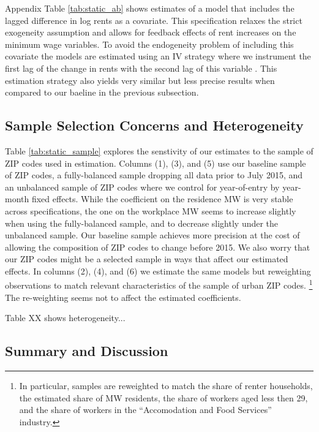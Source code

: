 Appendix Table \ref{tab:static_ab} shows estimates of a model that includes
the lagged difference in log rents as a covariate.
This specification relaxes the strict exogeneity assumption and allows for 
feedback effects of rent increases on the minimum wage variables.
To avoid the endogeneity problem of including this covariate the models are 
estimated using an IV strategy where we instrument the first lag of the change 
in rents with the second lag of this variable 
\parencite{ArellanoBond1991,ArellanoHonore2001}.
This estimation strategy also yields very similar but less precise results
when compared to our baeline in the previous subsection.

\subsection{Sample Selection Concerns and Heterogeneity}
\label{sec:results_heterogeneity}

Table \ref{tab:static_sample} explores the senstivity of our estimates to 
the sample of ZIP codes used in estimation.
Columns (1), (3), and (5) use our baseline sample of ZIP codes, 
a fully-balanced sample dropping all data prior to July 2015, and
an unbalanced sample of ZIP codes where we control for year-of-entry by
year-month fixed effects.
While the coefficient on the residence MW is very stable across specifications,
the one on the workplace MW seems to increase slightly when using the fully-balanced
sample, and to decrease slightly under the unbalanced sample.
Our baseline sample achieves more precision at the cost of allowing the 
composition of ZIP codes to change before 2015.
We also worry that our ZIP codes might be a selected sample in ways that affect
our estimated effects.
In columns (2), (4), and (6) we estimate the same models but reweighting 
observations to match relevant characteristics of the sample of urban 
ZIP codes.%
\footnote{In particular, samples are reweighted to match the share of renter
households, the estimated share of MW residents, the share of workers aged
less then 29, and the share of workers in the ``Accomodation and Food Services''
industry.}
The re-weighting seems not to affect the estimated coefficients.

Table XX shows heterogeneity...

\subsection{Summary and Discussion}
\label{sec:results_discussion}

